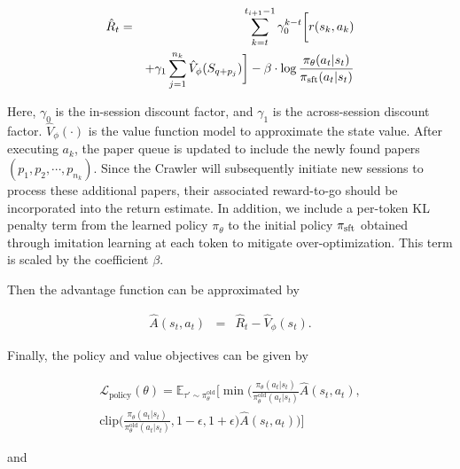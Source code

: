 \begin{small}
\begin{eqnarray}\label{q_function}
\hat{R}_t &=& \sum_{k=t}^{t_{i+1}-1}\gamma_0^{k-t}\bigg[r(s_{k}, a_{k}) \\
&& +\gamma_1\sum_{j=1}^{n_{k}}\hat{V}_\phi(S_{q+p_j})\bigg] - \beta\cdot\log\frac{\pi_\theta(a_t|s_t)}{\pi_{\rm sft}(a_t|s_t)}\nonumber
\end{eqnarray}
\end{small}
Here, $\gamma_0$ is the in-session discount factor, and $\gamma_1$ is the across-session discount factor. $\hat{V}_\phi(\cdot)$ is the value function model to approximate the state value. After executing $a_{k}$, the paper queue is updated to include the newly found papers $(p_1, p_2, \cdots, p_{n_{k}})$. Since the Crawler will subsequently initiate new sessions to process these additional papers, their associated reward-to-go should be incorporated into the return estimate. In addition, we include a per-token KL penalty term from the learned policy $\pi_\theta$ to the initial policy $\pi_{\rm sft}$ obtained through imitation learning at each token to mitigate over-optimization. This term is scaled by the coefficient $\beta$.

Then the advantage function can be approximated by

\begin{small}
\begin{eqnarray}\label{advantage}
\hat{A}(s_t, a_t)&=& \hat{R}_t-\hat{V}_\phi(s_t).
\end{eqnarray}
\end{small}

Finally, the policy and value objectives can be given by

\begin{small}
\begin{eqnarray}\label{policy_loss}
\mathcal{L}_{\text{policy}}(\theta)=\!\mathbb{E}_{\tau'\sim\pi_{\theta}^\text{old}}\Bigg[\min\bigg(\frac{\pi_\theta(a_t|s_t)}{\pi_{\theta}^\text{old}(a_t|s_t)}\hat{A}(s_t, a_t),\\
\text{clip}\Big(\frac{\pi_\theta(a_t|s_t)}{\pi_{\theta}^\text{old}(a_t|s_t)}, 1-\epsilon, 1+\epsilon\Big)\hat{A}(s_t, a_t)\bigg)\Bigg]\nonumber
\end{eqnarray}
\end{small}
and

